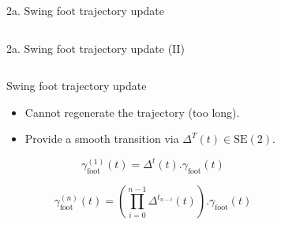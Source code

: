 \documentclass[hyperref={pdfpagelabels=false}]{beamer}
\begin{document}
\begin{frame}{2a. Swing foot trajectory update}
\begin{columns}[c]
\begin{column}{0.5\textwidth}
\begin{center}
      \end{center}
    \end{column}
  \end{columns}
\end{frame}

\begin{frame}{2a. Swing foot trajectory update (II)}

  \begin{columns}[c]
    \begin{column}{0.5\textwidth}

      \begin{block}{Swing foot trajectory update}
        \begin{itemize}
          \item Cannot regenerate the trajectory (too long).
          \item Provide a smooth transition via $\Delta^T (t) \in \text{SE}(2)$.
        \end{itemize}

        \begin{equation}
          \gamma_{\text{foot}}^{(1)}(t) = \Delta^t(t) . \gamma_{\text{foot}}(t)
        \end{equation}

        \begin{equation}
          \gamma_{\text{foot}}^{(n)}(t) = ( \prod_{i=0}^{n-1}\Delta^{t_{n-i}}(t) ) . \gamma_{\text{foot}}(t)
        \end{equation}
      \end{block}
    \end{column}

    \begin{column}{0.5\textwidth}

\begin{figure}[ht!]
  \begin{center}

\end{center}
\end{figure}
\end{column}
\end{columns}
\end{frame}
\end{document}
